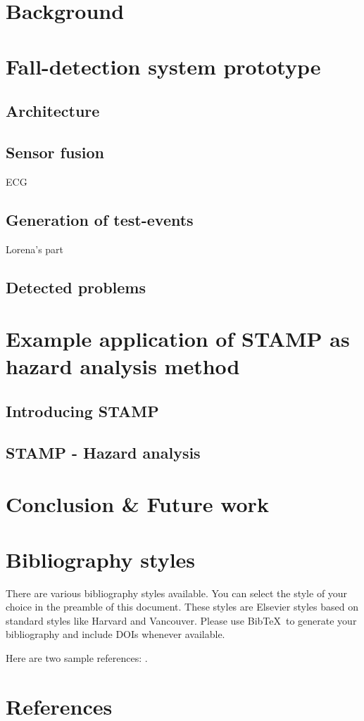 \documentclass[review]{elsarticle}
\begin{document}
\section{Background}


\section{Fall-detection system prototype}
	

\subsection{Architecture}


\subsection{Sensor fusion}
ECG

\subsection{Generation of test-events}
Lorena's part

\subsection{Detected problems}

\section{Example application of STAMP as hazard analysis method}

\subsection{Introducing STAMP}

\subsection{STAMP - Hazard analysis}

\section{Conclusion \& Future work}


\section{Bibliography styles}

There are various bibliography styles available. You can select the style of your choice in the preamble of this document. These styles are Elsevier styles based on standard styles like Harvard and Vancouver. Please use Bib\TeX\ to generate your bibliography and include DOIs whenever available.

Here are two sample references: \cite{Feynman1963118,Dirac1953888}.

\section*{References}


\end{document}
